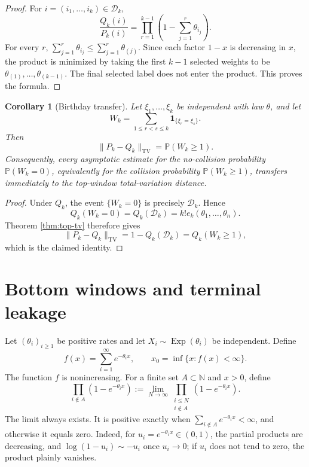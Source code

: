 \documentclass[11pt]{article}
\newtheorem{corollary}[theorem]{Corollary}
\theoremstyle{remark}
\newcommand{\Pp}{\mathbb P}
\newcommand{\one}{\mathbf 1}
\newcommand{\TV}{\mathrm{TV}}
\newcommand{\Exp}{\operatorname{Exp}}
\newcommand{\calD}{\mathcal D}
\begin{document}
\begin{proof}
For \(i=(i_1,\ldots,i_k)\in\calD_k\),
\[
        \frac{Q_k(i)}{P_k(i)}
        =\prod_{r=1}^{k-1}
        \left(1-\sum_{j=1}^r\theta_{i_j}\right).
\]
For every \(r\), \(\sum_{j=1}^r\theta_{i_j}\le \sum_{j=1}^r\theta_{(j)}\).  Since each factor \(1-x\) is decreasing in \(x\), the product is minimized by taking the first \(k-1\) selected weights to be \(\theta_{(1)},\ldots,\theta_{(k-1)}\).  The final selected label does not enter the product.  This proves the formula.
\end{proof}

\begin{corollary}[Birthday transfer]\label{cor:birthday}
Let \(\xi_1,\ldots,\xi_k\) be independent with law \(\theta\), and let
\[
        W_k=\sum_{1\le r<s\le k}\one_{\{\xi_r=\xi_s\}}.
\]
Then
\[
        \|P_k-Q_k\|_{\TV}=\Pp(W_k\ge1).
\]
Consequently, every asymptotic estimate for the no-collision probability
$\Pp(W_k=0)$, equivalently for the collision probability $\Pp(W_k\ge1)$,
transfers immediately to the top-window total-variation distance.
\end{corollary}

\begin{proof}
Under \(Q_k\), the event \(\{W_k=0\}\) is precisely \(\calD_k\).  Hence
\[
        Q_k(W_k=0)=Q_k(\calD_k)=k!e_k(\theta_1,\ldots,\theta_n).
\]
Theorem \ref{thm:top-tv} therefore gives
\[
        \|P_k-Q_k\|_{\TV}=1-Q_k(\calD_k)=Q_k(W_k\ge1),
\]
which is the claimed identity.
\end{proof}

\section{Bottom windows and terminal leakage}

Let \((\theta_i)_{i\ge1}\) be positive rates and let \(X_i\sim\Exp(\theta_i)\) be independent.  Define
\[
        f(x)=\sum_{i=1}^{\infty}e^{-\theta_i x},
        \qquad
        x_0=\inf\{x:f(x)<\infty\}.
\]
The function $f$ is nonincreasing.  For a finite set $A\subset\mathbb N$ and
$x>0$, define
\[
 \prod_{i\notin A}(1-e^{-\theta_i x})
 :=\lim_{N\to\infty}
 \prod_{\substack{i\le N\\i\notin A}}(1-e^{-\theta_i x}).
\]
The limit always exists.  It is positive exactly when
$\sum_{i\notin A}e^{-\theta_i x}<\infty$, and otherwise it equals zero.  Indeed,
for $u_i=e^{-\theta_i x}\in(0,1)$, the partial products are decreasing, and
$\log(1-u_i)\sim-u_i$ once $u_i\to0$; if $u_i$ does not tend to zero, the
product plainly vanishes.
\end{document}
